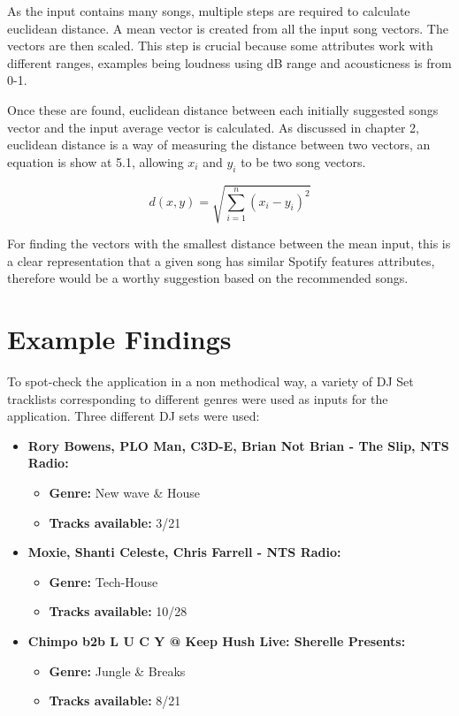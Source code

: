 As the input contains many songs, multiple steps are required to calculate euclidean distance. A mean vector is created from all the input song vectors. The vectors are then scaled. This step is crucial because some attributes work with different ranges, examples being loudness using dB range and acousticness is from 0-1.

Once these are found, euclidean distance between each initially suggested songs vector and the input average vector is calculated. As discussed in chapter 2, euclidean distance is a way of measuring the distance between two vectors, an equation is show at 5.1, allowing $x_{i}$ and $y_{i}$ to be two song vectors.

\begin{equation}
	d(x,y) = \sqrt{\sum _{i=1} ^{n}(x_{i} - y_{i})^{2}}
\end{equation}

For finding the vectors with the smallest distance between the mean input, this is a clear representation that a given song has similar Spotify features attributes, therefore would be a worthy suggestion based on the recommended songs.

\section{Example Findings}
To spot-check the application in a non methodical way, a variety of DJ Set tracklists corresponding to different genres were used as inputs for the application.  Three different DJ sets were used:

\begin{itemize}
	\item \textbf{Rory Bowens, PLO Man, C3D-E, Brian Not Brian - The Slip, NTS Radio: } 
	\begin{itemize}
		\item \textbf{Genre:} New wave \& House
		\item \textbf{Tracks available:} 3/21
	\end{itemize}
	\item \textbf{Moxie, Shanti Celeste, Chris Farrell - NTS Radio: } 
	\begin{itemize}
		\item \textbf{Genre:} Tech-House
		\item \textbf{Tracks available:} 10/28
	\end{itemize}
	\item \textbf{Chimpo b2b L U C Y @ Keep Hush Live: Sherelle Presents:}
	\begin{itemize}
		\item \textbf{Genre:} Jungle \& Breaks
		\item \textbf{Tracks available:} 8/21
	\end{itemize}
	
\end{itemize}



